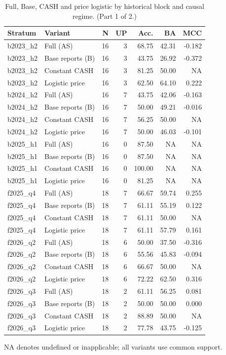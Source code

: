 \begin{table}[htbp]
\centering\small
\caption{Full, Base, CASH and price logistic by historical block and causal regime. (Part 1 of 2.)}
\label{tab:r1_common_strata}
\setlength{\tabcolsep}{3.5pt}
\begin{tabular}{llrrrrr}
\hline
Stratum & Variant & N & UP & Acc. & BA & MCC \\
\hline
b2023\_h2 & Full (AS) & 16 & 3 & 68.75 & 42.31 & -0.182 \\
b2023\_h2 & Base reports (B) & 16 & 3 & 43.75 & 26.92 & -0.372 \\
b2023\_h2 & Constant CASH & 16 & 3 & 81.25 & 50.00 & NA \\
b2023\_h2 & Logistic price & 16 & 3 & 62.50 & 64.10 & 0.222 \\
b2024\_h2 & Full (AS) & 16 & 7 & 43.75 & 42.06 & -0.163 \\
b2024\_h2 & Base reports (B) & 16 & 7 & 50.00 & 49.21 & -0.016 \\
b2024\_h2 & Constant CASH & 16 & 7 & 56.25 & 50.00 & NA \\
b2024\_h2 & Logistic price & 16 & 7 & 50.00 & 46.03 & -0.101 \\
b2025\_h1 & Full (AS) & 16 & 0 & 87.50 & NA & NA \\
b2025\_h1 & Base reports (B) & 16 & 0 & 87.50 & NA & NA \\
b2025\_h1 & Constant CASH & 16 & 0 & 100.00 & NA & NA \\
b2025\_h1 & Logistic price & 16 & 0 & 81.25 & NA & NA \\
f2025\_q4 & Full (AS) & 18 & 7 & 66.67 & 59.74 & 0.255 \\
f2025\_q4 & Base reports (B) & 18 & 7 & 61.11 & 55.19 & 0.122 \\
f2025\_q4 & Constant CASH & 18 & 7 & 61.11 & 50.00 & NA \\
f2025\_q4 & Logistic price & 18 & 7 & 61.11 & 57.79 & 0.161 \\
f2026\_q2 & Full (AS) & 18 & 6 & 50.00 & 37.50 & -0.316 \\
f2026\_q2 & Base reports (B) & 18 & 6 & 55.56 & 45.83 & -0.094 \\
f2026\_q2 & Constant CASH & 18 & 6 & 66.67 & 50.00 & NA \\
f2026\_q2 & Logistic price & 18 & 6 & 72.22 & 62.50 & 0.316 \\
f2026\_q3 & Full (AS) & 18 & 2 & 61.11 & 56.25 & 0.081 \\
f2026\_q3 & Base reports (B) & 18 & 2 & 50.00 & 50.00 & 0.000 \\
f2026\_q3 & Constant CASH & 18 & 2 & 88.89 & 50.00 & NA \\
f2026\_q3 & Logistic price & 18 & 2 & 77.78 & 43.75 & -0.125 \\
\hline
\end{tabular}
\par\smallskip\footnotesize NA denotes undefined or inapplicable; all variants use common support.
\end{table}

